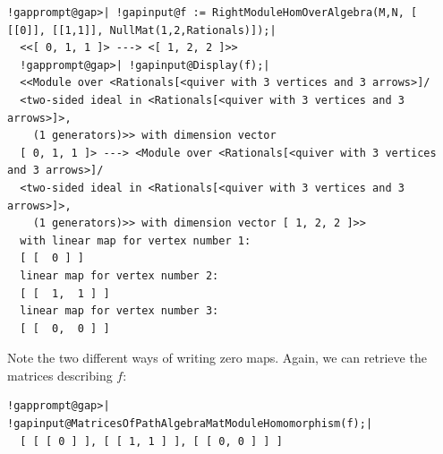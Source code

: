 \documentclass[a4paper,11pt]{report}
\begin{document}
{{\begin{Verbatim}[commandchars=!@|,fontsize=\small,frame=single,label=Example]
  !gapprompt@gap>| !gapinput@f := RightModuleHomOverAlgebra(M,N, [ [[0]], [[1,1]], NullMat(1,2,Rationals)]);|
  <<[ 0, 1, 1 ]> ---> <[ 1, 2, 2 ]>>
  !gapprompt@gap>| !gapinput@Display(f);|
  <<Module over <Rationals[<quiver with 3 vertices and 3 arrows>]/
  <two-sided ideal in <Rationals[<quiver with 3 vertices and 3 arrows>]>, 
    (1 generators)>> with dimension vector 
  [ 0, 1, 1 ]> ---> <Module over <Rationals[<quiver with 3 vertices and 3 arrows>]/
  <two-sided ideal in <Rationals[<quiver with 3 vertices and 3 arrows>]>, 
    (1 generators)>> with dimension vector [ 1, 2, 2 ]>>
  with linear map for vertex number 1:
  [ [  0 ] ]
  linear map for vertex number 2:
  [ [  1,  1 ] ]
  linear map for vertex number 3:
  [ [  0,  0 ] ]
\end{Verbatim}
 Note the two different ways of writing zero maps. Again, we can retrieve the
matrices describing $f$: 
\begin{Verbatim}[commandchars=!@|,fontsize=\small,frame=single,label=Example]
  !gapprompt@gap>| !gapinput@MatricesOfPathAlgebraMatModuleHomomorphism(f);|
  [ [ [ 0 ] ], [ [ 1, 1 ] ], [ [ 0, 0 ] ] ]
\end{Verbatim}
 }

 }

 
\end{document}
